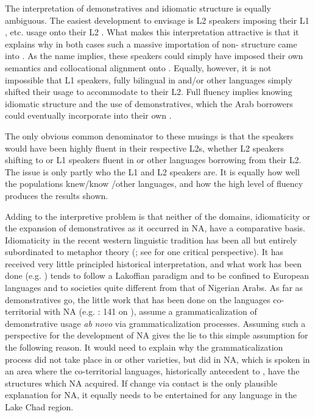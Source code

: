 \documentclass[output=paper]{langsci/langscibook}
\begin{document}
The interpretation of {demonstratives} and {idiomatic} structure is equally ambiguous. The easiest development to envisage is L2  speakers imposing their L1 ,  etc. usage onto their L2 . What makes this interpretation attractive is that it explains why in both cases such a massive importation of non- structure came into . As the name implies, these speakers could simply have imposed their own semantics and collocational alignment onto . Equally, however, it is not impossible that L1  speakers, fully bilingual in  and/or other languages simply shifted their  usage to accommodate to their L2. Full fluency implies knowing {idiomatic} structure and the use of {demonstratives}, which the Arab borrowers could eventually incorporate into their own .

The only obvious common denominator to these musings is that the speakers would have been highly fluent in their respective L2s, whether L2  speakers shifting to  or L1  speakers fluent in  or other languages borrowing from their L2. The issue is only partly who the L1 and L2 speakers are. It is equally how well the populations knew/know /other languages, and how the high level of fluency produces the results shown.

Adding to the interpretive problem is that neither of the domains, {idiomaticity} or the expansion of {demonstratives} as it occurred in NA, have a {comparative} basis. Idiomaticity in the recent western linguistic tradition has been all but entirely subordinated to metaphor theory (\citealt{LakoffJohnson1999}; see \citealt{Haser2005} for one critical perspective). It has received very little principled historical interpretation, and what work has been done (e.g. \citealt{Sweetser1990}) tends to follow a Lakoffian paradigm and to be confined to European languages and to societies quite different from that of Nigerian Arabs. As far as {demonstratives} go, the little work that has been done on the languages co-territorial with NA (e.g. \citealt{Kramer2014}: 141 on ), assume a {grammaticalization} of demonstrative usage \textit{ab} \textit{novo} via {grammaticalization} processes. Assuming such a perspective for the development of NA gives the lie to this simple assumption for the following reason. It would need to explain why the {grammaticalization} process did not take place in  or other  varieties, but did in NA, which is spoken in an area where the co-territorial languages, historically antecedent to , have the structures which NA acquired. If change via contact is the only plausible explanation for NA, it equally needs to be entertained for any language in the {Lake Chad} region.
\end{document}
